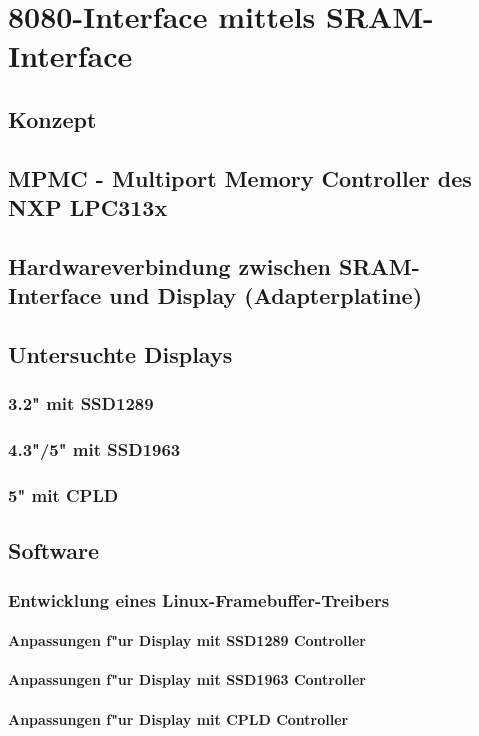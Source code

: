 \section{8080-Interface mittels SRAM-Interface}
\label{sec:TeilA_8080SRAM}

\subsection{Konzept}
\subsection{MPMC - Multiport Memory Controller des NXP LPC313x}
\subsection{Hardwareverbindung zwischen SRAM-Interface und Display (Adapterplatine)}
\subsection{Untersuchte Displays}
\subsubsection{3.2" mit SSD1289}
\subsubsection{4.3"/5" mit SSD1963}
\subsubsection{5" mit CPLD}
\subsection{Software}
\subsubsection{Entwicklung eines Linux-Framebuffer-Treibers}
\paragraph{Anpassungen f"ur Display mit SSD1289 Controller}
\paragraph{Anpassungen f"ur Display mit SSD1963 Controller}
\paragraph{Anpassungen f"ur Display mit CPLD Controller}
